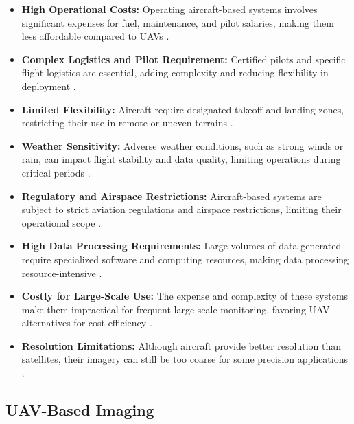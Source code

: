 \begin{itemize}
    \item \textbf{High Operational Costs:} Operating aircraft-based systems involves significant expenses for fuel, maintenance, and pilot salaries, making them less affordable compared to UAVs \parencite{delavarpour2021technical, phang2023from}.
    
    \item \textbf{Complex Logistics and Pilot Requirement:} Certified pilots and specific flight logistics are essential, adding complexity and reducing flexibility in deployment \parencite{adao2017hyperspectral}.
    
    \item \textbf{Limited Flexibility:} Aircraft require designated takeoff and landing zones, restricting their use in remote or uneven terrains \parencite{delavarpour2021technical}.
    
    \item \textbf{Weather Sensitivity:} Adverse weather conditions, such as strong winds or rain, can impact flight stability and data quality, limiting operations during critical periods \parencite{delavarpour2021technical}.
    
    \item \textbf{Regulatory and Airspace Restrictions:} Aircraft-based systems are subject to strict aviation regulations and airspace restrictions, limiting their operational scope \parencite{delavarpour2021technical}.
    
    \item \textbf{High Data Processing Requirements:} Large volumes of data generated require specialized software and computing resources, making data processing resource-intensive \parencite{delavarpour2021technical}.
    
    \item \textbf{Costly for Large-Scale Use:} The expense and complexity of these systems make them impractical for frequent large-scale monitoring, favoring UAV alternatives for cost efficiency \parencite{phang2023from}.
    
    \item \textbf{Resolution Limitations:} Although aircraft provide better resolution than satellites, their imagery can still be too coarse for some precision applications \parencite{adao2017hyperspectral}.
  \end{itemize}
  
\subsection{UAV-Based Imaging}

